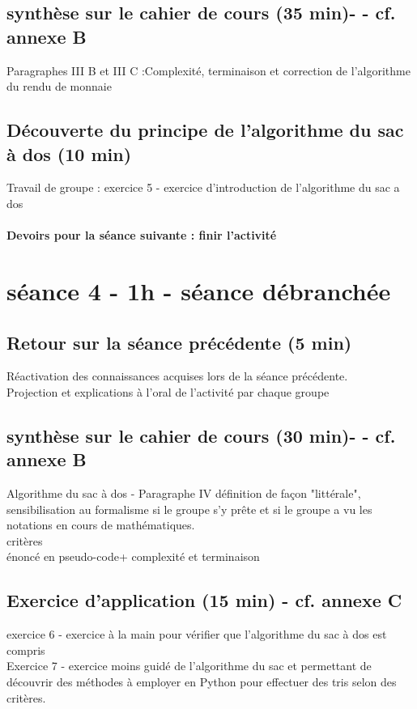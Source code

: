 \documentclass[12pt,french]{report}
\begin{document}
\subsection{synthèse sur le cahier de cours (35 min)-  - cf. annexe B}
Paragraphes III B et III C :Complexité, terminaison et correction de l'algorithme du rendu de monnaie\\

\subsection{Découverte du principe de l'algorithme du sac à dos (10 min)}
Travail de groupe : exercice 5 - exercice d'introduction de l'algorithme du sac a dos

\paragraph{Devoirs pour la séance suivante : finir l'activité }
\section{séance 4 - 1h - séance débranchée}
\subsection{Retour sur la séance précédente (5 min)}
Réactivation des connaissances acquises lors de la séance précédente.\\
Projection et explications à l’oral de l'activité par chaque groupe
\subsection{synthèse sur le cahier de cours (30 min)-  - cf. annexe B}
Algorithme du sac à dos - Paragraphe IV
définition de façon "littérale", sensibilisation au formalisme si le groupe s'y prête et si le groupe a vu les notations en cours de mathématiques.\\
critères\\
énoncé en pseudo-code+ complexité et terminaison\\
\subsection{Exercice d'application (15 min) - cf. annexe C}
exercice 6 - exercice à la main pour vérifier que l'algorithme du sac à dos est compris\\
Exercice 7  - exercice moins guidé de l'algorithme du sac et permettant de découvrir des méthodes à employer en Python pour effectuer des tris selon des critères.
\end{document}
